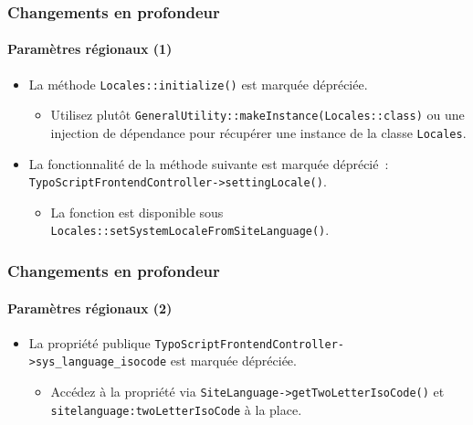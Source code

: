\begin{frame}[fragile]
	\frametitle{Changements en profondeur}
	\framesubtitle{Paramètres régionaux (1)}

	\begin{itemize}
		\item La méthode \texttt{Locales::initialize()} est marquée dépréciée.

			\begin{itemize}\smaller
				\item[\ding{228}] Utilisez plutôt \texttt{GeneralUtility::makeInstance(Locales::class)} ou une
				injection de dépendance pour récupérer une instance de la classe \texttt{Locales}.
			\end{itemize}\normalsize

		\item La fonctionnalité de la méthode suivante est marquée déprécié~:\newline
			\texttt{TypoScriptFrontendController->settingLocale()}.

			\begin{itemize}\smaller
				\item[\ding{228}] La fonction est disponible sous
				{\fontsize{8}{8}\selectfont\texttt{Locales::setSystemLocaleFromSiteLanguage()}.}
			\end{itemize}\normalsize

	\end{itemize}

\end{frame}


\begin{frame}[fragile]
	\frametitle{Changements en profondeur}
	\framesubtitle{Paramètres régionaux (2)}

	\begin{itemize}
		\item La propriété publique \texttt{TypoScriptFrontendController->sys\_language\_isocode}
			est marquée dépréciée.

			\begin{itemize}\smaller
				\item[\ding{228}] Accédez à la propriété via \texttt{SiteLanguage->getTwoLetterIsoCode()}
				et \texttt{sitelanguage:twoLetterIsoCode} à la place.
			\end{itemize}\normalsize

	\end{itemize}

\end{frame}

